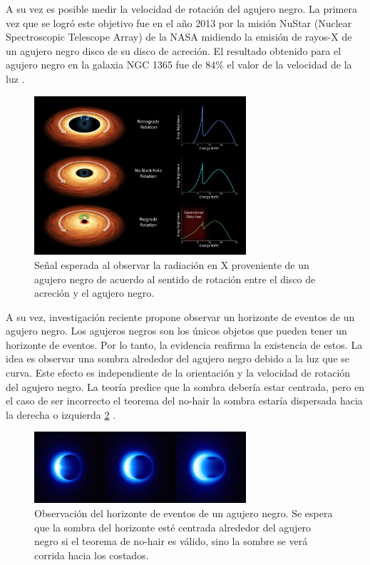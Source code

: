 \documentclass[12pt]{article}
\theoremstyle{plain}
\begin{document}
A su vez es posible medir la velocidad de rotación del agujero negro. La primera vez que se logró este objetivo  fue en el año 2013 por la misión NuStar (Nuclear Spectroscopic Telescope Array) \cite{nustar} de la NASA midiendo la emisión de rayos-X de un agujero negro disco de su disco de acreción. El resultado obtenido para el agujero negro en la galaxia NGC 1365 fue de $84\%$ el valor de la velocidad de la luz \cite{spin} . 

\begin{figure}[H]
\centering
\includegraphics[width=0.7\textwidth]{spin_bh.jpg}
\caption{Señal esperada al observar la radiación en X proveniente de un agujero negro de acuerdo al sentido de rotación entre el disco de acreción y el agujero negro.}
\label{spin_bhh}
\end{figure}

A su vez, investigación reciente \cite{ehorizon} propone observar un horizonte de eventos de un agujero negro. Los agujeros negros son los únicos objetos que pueden tener un horizonte de eventos. Por lo tanto, la evidencia reafirma la existencia de estos. La idea es observar una sombra alrededor del agujero negro debido a la luz que se curva. Este efecto es independiente de la orientación y la velocidad de rotación del agujero negro. La teoría predice que la sombra debería estar centrada, pero en el caso de ser incorrecto el teorema del no-hair la sombra estaría dispersada hacia la derecha o izquierda \ref{ehbh_foto} .

\begin{figure}[H]
\centering
\includegraphics[width=0.7\textwidth]{ehbh.jpeg}
\caption{Observación del horizonte de eventos de un agujero negro. Se espera que la sombra del horizonte esté centrada alrededor del agujero negro si el teorema de no-hair es válido, sino la sombre se verá corrida hacia los costados.}
\label{ehbh_foto}
\end{figure}
\end{document}
